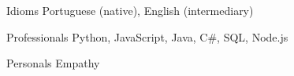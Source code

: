 
\begin{cvskills}
  \cvskill
  {Idioms} %
  {Portuguese (native), English (intermediary)} %

  \cvskill
  {Professionals} %
  {Python, JavaScript, Java, C\#, SQL, Node.js} %

  \cvskill
  {Personals}
  {Empathy}
\end{cvskills}
